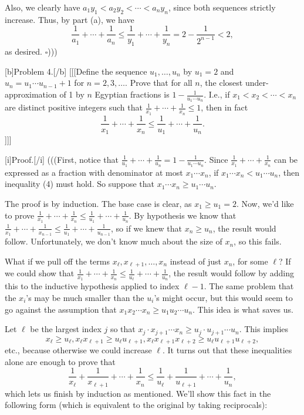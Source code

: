 Also, we clearly have $a_1 y_1 < a_2 y_2 < \cdots < a_n y_n$, since both sequences strictly increase. Thus, by part (a), we have  
\[ \frac{1}{a_1} + \cdots + \frac{1}{a_n} \leq \frac{1}{y_1} + \cdots + \frac{1}{y_n} = 2 - \frac{1}{2^{n-1}} < 2, \]  
as desired. $\square$)))

[b]Problem 4.[/b]  [[[Define the sequence $u_1, \ldots, u_n$ by $u_1 = 2$ and $u_n = u_1 \cdots u_{n-1} + 1$ for $n = 2, 3, \ldots.$ Prove that for all $n$, the closest under-approximation of 1 by $n$ Egyptian fractions is $1 - \frac{1}{u_1 \cdots u_n}$. I.e., if $x_1 < x_2 < \cdots < x_n$ are distinct positive integers such that $\frac{1}{x_1} + \cdots + \frac{1}{x_n} \leq 1$, then in fact  
\[ \frac{1}{x_1} + \cdots + \frac{1}{x_n} \leq \frac{1}{u_1} + \cdots + \frac{1}{u_n}. \tag{4} \]  ]]]

[i]Proof.[/i] (((First, notice that $\frac{1}{u_1} + \cdots + \frac{1}{u_n} = 1 - \frac{1}{u_1 \cdots u_n}$. Since $\frac{1}{x_1} + \cdots + \frac{1}{x_n}$ can be expressed as a fraction with denominator at most $x_1 \cdots x_n$, if $x_1 \cdots x_n < u_1 \cdots u_n$, then inequality (4) must hold. So suppose that $x_1 \cdots x_n \geq u_1 \cdots u_n$.  

The proof is by induction. The base case is clear, as $x_1 \geq u_1 = 2$. Now, we'd like to prove $\frac{1}{x_1} + \cdots + \frac{1}{x_n} \leq \frac{1}{u_1} + \cdots + \frac{1}{u_n}$. By hypothesis we know that $\frac{1}{x_1} + \cdots + \frac{1}{x_{n-1}} \leq \frac{1}{u_1} + \cdots + \frac{1}{u_{n-1}}$, so if we knew that $x_n \geq u_n$, the result would follow. Unfortunately, we don't know much about the size of $x_n$, so this fails.  

What if we pull off the terms $x_{\ell}, x_{\ell + 1}, \ldots, x_n$ instead of just $x_n$, for some $\ell$? If we could show that $\frac{1}{x_1} + \cdots + \frac{1}{x_n} \leq \frac{1}{u_{\ell}} + \cdots + \frac{1}{u_n}$, the result would follow by adding this to the inductive hypothesis applied to index $\ell - 1$. The same problem that the $x_i$'s may be much smaller than the $u_i$'s might occur, but this would seem to go against the assumption that $x_1 x_2 \cdots x_n \geq u_1 u_2 \cdots u_n$. This idea is what saves us.  

Let $\ell$ be the largest index $j$ so that $x_j \cdot x_{j+1} \cdots x_n \geq u_j \cdot u_{j+1} \cdots u_n$. This implies  
\[ x_{\ell} \geq u_{\ell}, x_{\ell} x_{\ell + 1} \geq u_{\ell} u_{\ell + 1}, x_{\ell} x_{\ell + 1} x_{\ell + 2} \geq u_{\ell} u_{\ell + 1} u_{\ell + 2}, \]  
etc., because otherwise we could increase $\ell$. It turns out that these inequalities alone are enough to prove that  
\[ \frac{1}{x_{\ell}} + \frac{1}{x_{\ell + 1}} + \cdots + \frac{1}{x_n} \leq \frac{1}{u_{\ell}} + \frac{1}{u_{\ell + 1}} + \cdots + \frac{1}{u_n}, \]
which lets us finish by induction as mentioned. We'll show this fact in the following form (which is equivalent to the original by taking reciprocals):  


